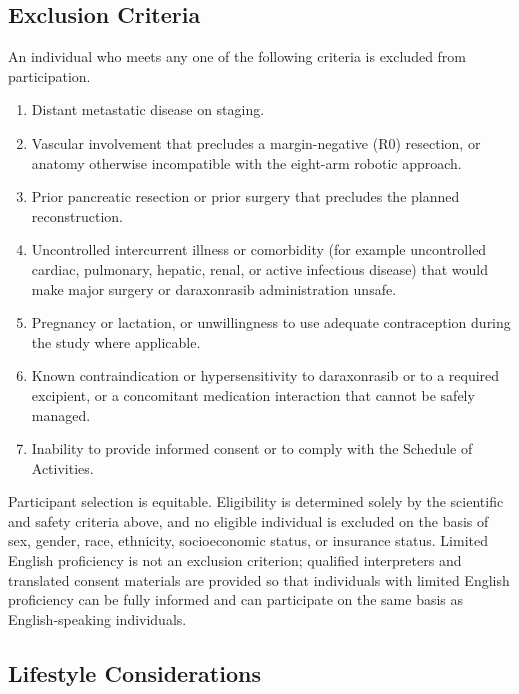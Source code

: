 \subsection{Exclusion Criteria}

An individual who meets any one of the following criteria is excluded from
participation.

\begin{enumerate}[leftmargin=1.6em,itemsep=2pt,topsep=2pt]
\item Distant metastatic disease on staging.
\item Vascular involvement that precludes a margin-negative (R0) resection, or
anatomy otherwise incompatible with the eight-arm robotic approach.
\item Prior pancreatic resection or prior surgery that precludes the planned
reconstruction.
\item Uncontrolled intercurrent illness or comorbidity (for example uncontrolled
cardiac, pulmonary, hepatic, renal, or active infectious disease) that would make
major surgery or daraxonrasib administration unsafe.
\item Pregnancy or lactation, or unwillingness to use adequate contraception
during the study where applicable.
\item Known contraindication or hypersensitivity to daraxonrasib or to a required
excipient, or a concomitant medication interaction that cannot be safely managed.
\item Inability to provide informed consent or to comply with the Schedule of
Activities.
\end{enumerate}

Participant selection is equitable. Eligibility is determined solely by the
scientific and safety criteria above, and no eligible individual is excluded on
the basis of sex, gender, race, ethnicity, socioeconomic status, or insurance
status. Limited English proficiency is not an exclusion criterion; qualified
interpreters and translated consent materials are provided so that individuals
with limited English proficiency can be fully informed and can participate on the
same basis as English-speaking individuals.

\subsection{Lifestyle Considerations}

